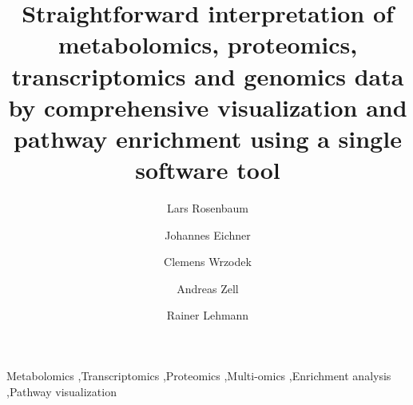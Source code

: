 \documentclass[final,5p,times,twocolumn]{elsarticle}
\begin{document}
\begin{frontmatter}



\title{Straightforward interpretation of metabolomics, proteomics, transcriptomics and genomics data by comprehensive visualization and pathway enrichment using a single software tool}


\author[uni]{Lars Rosenbaum}
\author[uni]{Johannes Eichner}
\author[uni]{Clemens Wrzodek}
\author[uni]{Andreas Zell}
\author[klinikum,dzd]{Rainer Lehmann}
\address[uni]{Center for Bioinformatics, University of T\"ubingen, T\"ubingen, Germany}
\address[klinikum]{Division of Clinical Chemistry and Pathobiochemistry (Central Laboratory), University Hospital T\"ubingen, T\"ubingen, Germany}
\address[dzd]{Institute of Diabetes Research and Metabolic Diseases, Member of the German Center for Diabetes Research, University of T\"ubingen, T\"ubingen, Germany}

\begin{abstract}

\end{abstract}

\begin{keyword}
Metabolomics \sep Transcriptomics \sep Proteomics \sep Multi-omics \sep Enrichment analysis \sep Pathway visualization

\end{keyword}

\end{frontmatter}
\end{document}
